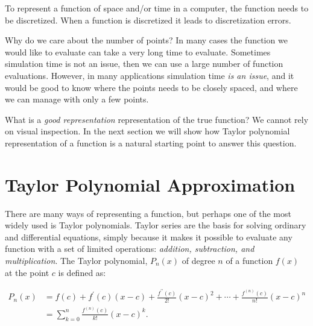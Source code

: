 \documentclass[graybox,sectrefs,envcountresetchap,open=right,final]{svmonodo}
\newenvironment{graybox2admon}[1][]{
\begin{graybox2mdframed}[frametitle=#1]
}
{
\end{graybox2mdframed}
}
\begin{document}
\begin{graybox2admon}[Discretization]
To represent a function of space and/or time in a computer, the function needs to be discretized. When a function is discretized it leads to discretization errors.
\end{graybox2admon}




Why do we care about the number of points? In many cases the function we would like to evaluate can take a very long time to evaluate. Sometimes simulation time is not an issue, then we can use a large number of function
evaluations. However, in many applications simulation time \emph{is an issue}, and it would be good to know where the points needs to be closely spaced, and where we can 
manage with only a few points.

What is a \emph{good representation} representation of the true function? We cannot rely on visual inspection. In the next section we will show how Taylor polynomial representation of a function is a natural starting point to answer this question.

\section{Taylor Polynomial Approximation}
There are many ways of representing a function, but perhaps one of the most widely used is Taylor polynomials. 
Taylor series are the basis for solving ordinary and differential equations, simply because it makes it possible to evaluate any function with a set
of limited operations: \emph{addition, subtraction, and multiplication}. The Taylor polynomial, $P_n(x)$ of degree $n$ of a function $f(x)$ at the point $c$ is defined as:


\begin{graybox2admon}[Taylor polynomial:]

\begin{align}
 P_n(x) &= f(c)+f^\prime(c)(x-c)+\frac{f^{\prime\prime}(c)}{2!}(x-c)^2+\cdots+\frac{f^{(n)}(c)}{n!}(x-c)^n\nonumber\\ 
&=\sum_{k=0}^n\frac{f^{(n)}(c)}{k!}(x-c)^k.\label{eq:taylor:taylori}
\end{align}
\end{graybox2admon}
\end{document}
